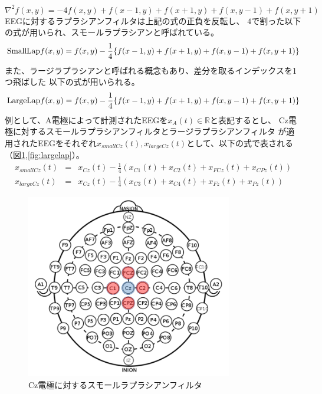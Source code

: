\begin{equation}
    \nabla^2 f(x,y) = -4f(x,y) + f(x-1,y) + f(x+1,y) + f(x,y-1) + f(x,y+1)
\end{equation}
EEGに対するラプラシアンフィルタは上記の式の正負を反転し、
\(4\)で割った以下の式が用いられ、スモールラプラシアンと呼ばれている\cite{スモールラプラシアン}。
\begin{equation}
    {\rm SmallLap} f(x,y) = f(x,y) - \frac{1}{4} \{ f(x-1,y) + f(x+1,y) + f(x,y-1) + f(x,y+1) \}
\end{equation}
また、ラージラプラシアンと呼ばれる概念もあり\cite{スモールラプラシアン}、差分を取るインデックスを1つ飛ばした
以下の式が用いられる。
\begin{equation}
    {\rm LargeLap} f(x,y) = f(x,y) - \frac{1}{4} \{ f(x-1,y) + f(x+1,y) + f(x,y-1) + f(x,y+1) \}
\end{equation}
例として、A電極によって計測されたEEGを\(x_A(t) \in \mathbb R\)と表記するとし、
Cz電極に対するスモールラプラシアンフィルタとラージラプラシアンフィルタ
が適用されたEEGをそれぞれ\(x_{smallCz}(t), x_{largeCz}(t)\)として、以下の式で表される（図\ref{fig:smalllap},\ref{fig:largelap}）。
\begin{eqnarray}
    x_{smallCz}(t) & = & x_{Cz}(t) - \frac{1}{4}(x_{C1}(t) + x_{C2}(t) + x_{FCz}(t) + x_{CPz}(t)) \\
    x_{largeCz}(t) & = & x_{Cz}(t) - \frac{1}{4}(x_{C3}(t) + x_{C4}(t) + x_{Fz}(t) + x_{Pz}(t))     
\end{eqnarray}
\begin{figure}[p]
    \centering
    \includegraphics[width=9cm]{images/smalllap.png}
    \caption{Cz電極に対するスモールラプラシアンフィルタ}
    \label{fig:smalllap}
\end{figure}
